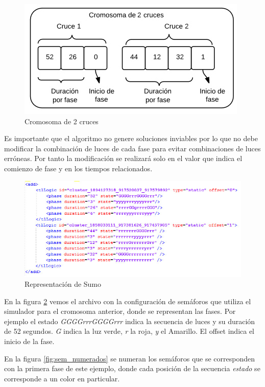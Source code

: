  \begin{figure}[h]
 	\centering
 	\includegraphics[width=0.7\linewidth]{Figures/cromosoma1}
 	\caption{Cromosoma de 2 cruces}
 	\label{fig:cromosoma1}
 \end{figure}
 
Es  importante que el algoritmo no genere soluciones inviables por lo que no debe modificar la combinación de luces de cada fase para evitar combinaciones de luces erróneas. Por tanto la modificación se realizará solo en el valor que indica el comienzo de fase y en los tiempos relacionados.

\begin{figure}[H]
	\centering
	\includegraphics[width=\linewidth]{Figures/rep_sumo2}
	\caption{Representación de Sumo}
	\label{fig:rep_sumo}
\end{figure}

En la figura \ref{fig:rep_sumo} vemos el archivo con la configuración de semáforos que utiliza el simulador para el cromosoma anterior, donde se representan las fases. Por ejemplo el estado \emph{GGGGrrrGGGGrrr} indica la secuencia de luces y su duración de 52 segundos. \emph{G} indica la luz verde, \emph{r} la roja, \emph{y} el Amarillo. El offset indica el inicio de la fase. 

En la figura \ref{fig:sem_numerados} se numeran los semáforos que se corresponden con la primera fase de este ejemplo, donde cada posición de la secuencia \emph{estado} se corresponde a un color en particular. 
\newpage

